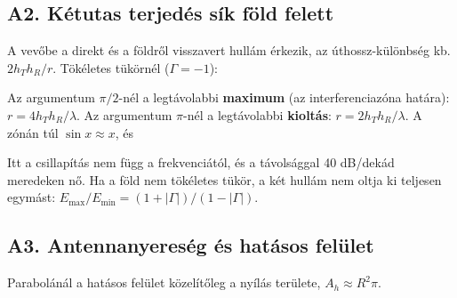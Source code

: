 \subsection{\texorpdfstring{A2. Kétutas terjedés sík föld felett}{A2. Kétutas terjedés sík föld felett}}\label{a3-ketutas}
A vevőbe a direkt és a földről visszavert hullám érkezik, az úthossz-különbség kb. $2h_Th_R/r$. Tökéletes tükörnél ($\Gamma=-1$):

\begin{center}\end{center}

Az argumentum $\pi/2$-nél a legtávolabbi \textbf{maximum} (az interferenciazóna határa): $r=4h_Th_R/\lambda$. Az argumentum $\pi$-nél a legtávolabbi \textbf{kioltás}: $r=2h_Th_R/\lambda$. A zónán túl $\sin x\approx x$, és

\begin{center}\end{center}

Itt a csillapítás nem függ a frekvenciától, és a távolsággal 40 dB/dekád meredeken nő. Ha a föld nem tökéletes tükör, a két hullám nem oltja ki teljesen egymást: $E_{\max}/E_{\min}=(1+|\Gamma|)/(1-|\Gamma|)$.

\subsection{\texorpdfstring{A3. Antennanyereség és hatásos felület}{A3. Antennanyereség és hatásos felület}}\label{a3-antenna}
\begin{center}\end{center}

Parabolánál a hatásos felület közelítőleg a nyílás területe, $A_h\approx R^2\pi$.

